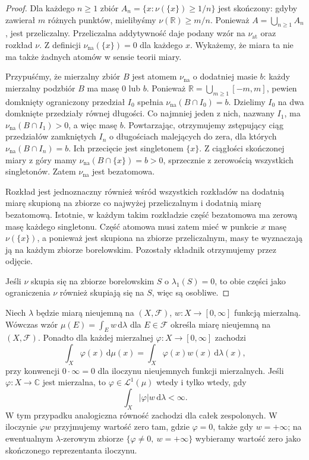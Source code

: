 \begin{proof}
Dla każdego $n\ge1$ zbiór
$A_n=\{x:\nu(\{x\})\ge1/n\}$ jest skończony:
gdyby zawierał $m$ różnych punktów, mielibyśmy
$\nu(\mathbb R)\ge m/n$. Ponieważ
$A=\bigcup_{n\ge1}A_n$, jest przeliczalny.
Przeliczalna addytywność daje podany wzór na
$\nu_{\mathrm{at}}$ oraz rozkład $\nu$.
Z definicji $\nu_{\mathrm{na}}(\{x\})=0$ dla
każdego $x$. Wykażemy, że miara ta nie ma także
żadnych atomów w sensie teorii miary.

Przypuśćmy, że mierzalny zbiór $B$ jest atomem
$\nu_{\mathrm{na}}$ o dodatniej masie $b$:
każdy mierzalny podzbiór $B$ ma masę $0$ lub $b$.
Ponieważ $\mathbb R=\bigcup_{m\ge1}[-m,m]$,
pewien domknięty ograniczony przedział $I_0$
spełnia $\nu_{\mathrm{na}}(B\cap I_0)=b$.
Dzielimy $I_0$ na dwa domknięte przedziały równej
długości. Co najmniej jeden z nich, nazwany $I_1$,
ma $\nu_{\mathrm{na}}(B\cap I_1)>0$, a więc masę $b$.
Powtarzając, otrzymujemy zstępujący ciąg przedziałów
zamkniętych $I_n$ o długościach malejących do zera,
dla których $\nu_{\mathrm{na}}(B\cap I_n)=b$.
Ich przecięcie jest singletonem $\{x\}$.
Z ciągłości skończonej miary z góry mamy
$\nu_{\mathrm{na}}(B\cap\{x\})=b>0$,
sprzecznie z zerowością wszystkich singletonów.
Zatem $\nu_{\mathrm{na}}$ jest bezatomowa.

Rozkład jest jednoznaczny również wśród wszystkich
rozkładów na dodatnią miarę skupioną na zbiorze
co najwyżej przeliczalnym i dodatnią miarę bezatomową.
Istotnie, w każdym takim rozkładzie część bezatomowa
ma zerową masę każdego singletonu. Część atomowa
musi zatem mieć w punkcie $x$ masę $\nu(\{x\})$,
a ponieważ jest skupiona na zbiorze przeliczalnym,
masy te wyznaczają ją na każdym zbiorze borelowskim.
Pozostały składnik otrzymujemy przez odjęcie.

Jeśli $\nu$ skupia się na zbiorze borelowskim $S$
o $\lambda_1(S)=0$, to obie części jako ograniczenia
$\nu$ również skupiają się na $S$, więc są osobliwe.
\end{proof}
\begin{lemat}
\label{lem:integration-density-18}
Niech $\lambda$ będzie miarą nieujemną na $(X,\mathcal F)$,
$w:X\to[0,\infty]$ funkcją mierzalną. Wówczas wzór
$\mu(E)=\int_Ew\,\mathrm d\lambda$ dla $E\in\mathcal F$
określa miarę nieujemną na $(X,\mathcal F)$.
Ponadto dla każdej mierzalnej $\varphi:X\to[0,\infty]$
zachodzi
\begin{equation}\label{eq:integration-density-18}
\int_X\varphi(x)\,\mathrm d\mu(x)
=\int_X\varphi(x)w(x)\,\mathrm d\lambda(x),
\end{equation}
przy konwencji $0\cdot\infty=0$ dla iloczynu
nieujemnych funkcji mierzalnych. Jeśli $\varphi:X\to\mathbb C$ jest mierzalna, to
$\varphi\in\mathcal L^1(\mu)$ wtedy i tylko wtedy, gdy
\[
 \int_X|\varphi|w\,\mathrm d\lambda<\infty.
\]
W tym przypadku analogiczna równość zachodzi dla całek
zespolonych. W iloczynie $\varphi w$ przyjmujemy wartość
zero tam, gdzie $\varphi=0$, także gdy $w=+\infty$;
na ewentualnym $\lambda$-zerowym zbiorze
$\{\varphi\ne0,\ w=+\infty\}$ wybieramy wartość zero
jako skończonego reprezentanta iloczynu.
\end{lemat}
